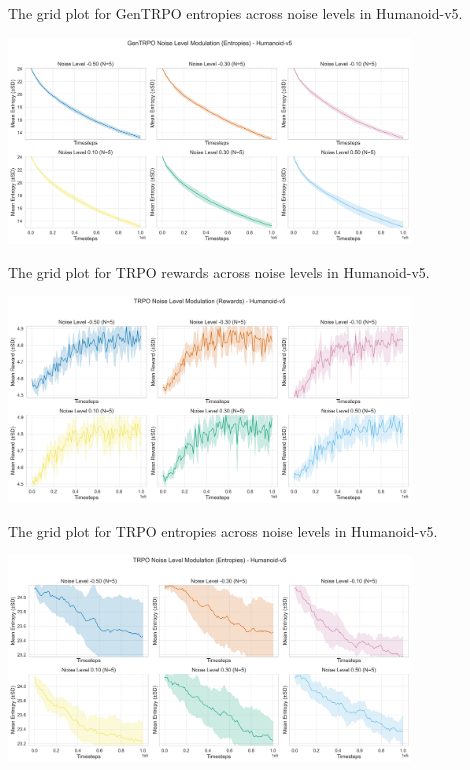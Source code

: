 \documentclass{svproc}
\begin{document}
The grid plot for GenTRPO entropies across noise levels in Humanoid-v5.

\begin{center}
\includegraphics[width=0.8\textwidth]{graph_Humanoid-v5_GenTRPO_noise_mod_entropies_grid.png}
\end{center}

The grid plot for TRPO rewards across noise levels in Humanoid-v5.

\begin{center}
\includegraphics[width=0.8\textwidth]{graph_Humanoid-v5_TRPO_noise_mod_rewards_grid.png}
\end{center}

The grid plot for TRPO entropies across noise levels in Humanoid-v5.

\begin{center}
\includegraphics[width=0.8\textwidth]{graph_Humanoid-v5_TRPO_noise_mod_entropies_grid.png}
\end{center}
\end{document}
